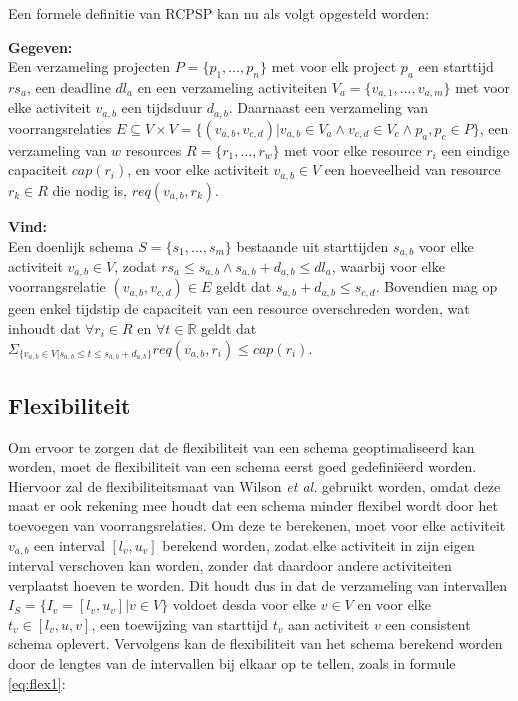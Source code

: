 Een formele definitie van RCPSP kan nu als volgt opgesteld worden:

\textbf{Gegeven:}\\
Een verzameling projecten $P = \{p_1, \dots ,p_n\}$ met voor elk project $p_a$ een starttijd $rs_a$, een deadline $dl_a$ en een verzameling activiteiten $V_a = \{v_{a,1},\dots ,v_{a,m}\}$ met voor elke activiteit $v_{a,b}$ een tijdsduur $d_{a,b}$. Daarnaast een verzameling van voorrangsrelaties $E \subseteq V \times V = \{(v_{a,b},v_{c,d}) | v_{a,b} \in V_a \wedge v_{c,d} \in V_c \wedge p_a,p_c \in P \}$, een verzameling van $w$ resources $R = \{r_1, \dots ,r_w\}$ met voor elke resource $r_i$ een eindige capaciteit $cap(r_i)$, en voor elke activiteit $v_{a,b} \in V$ een hoeveelheid van resource $r_k \in R$ die nodig is, $req(v_{a,b},r_k)$.

\textbf{Vind:}\\
Een doenlijk schema $S = \{s_1,\dots ,s_m\}$ bestaande uit starttijden $s_{a,b}$ voor elke activiteit $v_{a,b} \in V$, zodat $rs_a \leq s_{a,b} \wedge s_{a,b} + d_{a,b} \leq dl_a$, waarbij voor elke voorrangsrelatie $(v_{a,b},v_{c,d}) \in E$ geldt dat $s_{a,b} + d_{a,b} \leq s_{c,d}$. Bovendien mag op geen enkel tijdstip de capaciteit van een resource overschreden worden, wat inhoudt dat $\forall r_i \in R$ en $\forall t \in \mathbb{R}$ geldt dat $\Sigma _{\{v_{a,b} \in V | s_{a,b} \leq t \leq s_{a,b} + d_{a,b}\}} req(v_{a,b},r_i) \leq cap(r_i)$.

\subsection{Flexibiliteit}
\label{subsec:flexprobleem}
Om ervoor te zorgen dat de flexibiliteit van een schema geoptimaliseerd kan worden, moet de flexibiliteit van een schema eerst goed gedefini\"eerd worden. Hiervoor zal de flexibiliteitsmaat van Wilson \emph{et al.} \cite{wilson2013flexibility} gebruikt worden, omdat deze maat er ook rekening mee houdt dat een schema minder flexibel wordt door het toevoegen van voorrangsrelaties. Om deze te berekenen, moet voor elke activiteit $v_{a,b}$ een interval $[l_v,u_v]$ berekend worden, zodat elke activiteit in zijn eigen interval verschoven kan worden, zonder dat daardoor andere activiteiten verplaatst hoeven te worden. Dit houdt dus in dat de verzameling van intervallen $I_S = \{I_v = [l_v,u_v] | v \in V\}$ voldoet desda voor elke $v \in V$ en voor elke $t_v \in [l_v,u,v]$, een toewijzing van starttijd $t_v$ aan activiteit $v$ een consistent schema oplevert. Vervolgens kan de flexibiliteit van het schema berekend worden door de lengtes van de intervallen bij elkaar op te tellen, zoals in formule \ref{eq:flex1}:

